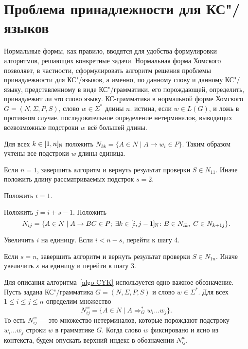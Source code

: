 \section{Проблема принадлежности для КС"/языков}
\label{Chapter7ProblemB}
Нормальные формы, как правило, вводятся для удобства формулировки
алгоритмов, решающих конкретные задачи. Нормальная форма Хомского
позволяет, в частности, сформулировать алгоритм решения проблемы
принадлежности для КС"/языков, а именно, по данному слову и данному
КС"/языку, представленному в виде КС"/грамматики, его порождающей,
определить, принадлежит ли это слово языку.
{\label{algo-CYK}КС-грамматика в нормальной форме Хомского $G=(N,\Sigma,P,S)$,
слово $w\in \Sigma^*$ длины $n$.}
{истина, если $w \in L(G)$, и ложь в противном случае.}
{последовательное определение нетерминалов, выводящих
всевозможные подстроки $w$ всё большей длины.}
{
\item Для всех $k\in [1,n]_{\mathbb N}$ положить $N_{kk} = \{ A \in N \mid
    A \to w_i \in P\}$. Таким образом учтены все подстроки $w$ длины
    единица.

\item Если $n=1$, завершить алгоритм и вернуть результат
    проверки $S \in N_{11}$. Иначе положить длину
    рассматриваемых подстрок $s = 2$.

\item Положить $i = 1$.

\item
    Положить $j = i + s - 1$. Положить
    \[
        N_{ij} = \{ A \in N \mid A \to BC \in P; \;
                \exists k \in [i, j-1]_{\mathbb N} \colon B \in N_{ik}, \;
                C \in N_{k+1 j} \}.
    \]

\item Увеличить $i$ на единицу. Если $ i < n - s$, перейти
    к шагу 4.

\item Если $s = n$, завершить алгоритм и вернуть результат
    проверки $S \in N_{1n}$. Иначе увеличить $s$ на единицу и
    перейти к шагу 3.
}
Для описания алгоритма~\ref{algo-CYK} используется
одно важное обозначение. Пусть задана
КС"/грамматика $G=(N,\Sigma,P,S)$ и слово $w\in \Sigma^*$.
Для всех $1 \leqslant i \leqslant j \leqslant n$
определим множество
\[
    N_{ij}^w = \{ A \in N \mid A \Rightarrow^*_G w_i \ldots w_j \}.
\]
То есть $N_{ij}^w$ ---  это множество нетерминалов, которые порождают
подстроку $w_i \ldots w_j$ строки $w$ в грамматике $G$. Когда слово
$w$ фиксировано и ясно из контекста, будем опускать верхний индекс
в обозначении $N_{ij}^w$.


